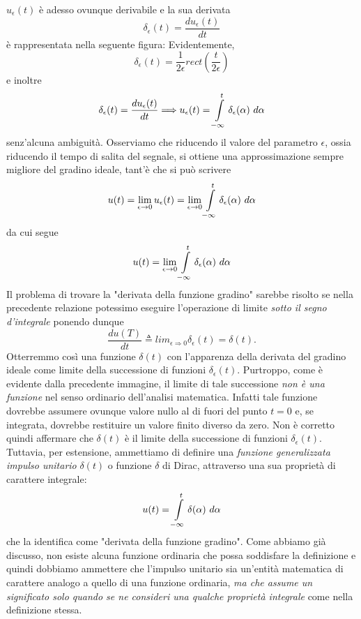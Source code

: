 \documentclass[12pt,oneside,openany]{memoir}
\numberwithin{equation}{subsection}
\begin{document}
$u_{\epsilon}(t)$ \`e adesso ovunque derivabile e la sua derivata
\[
    \delta_{\epsilon}(t) = \frac{d u_{\epsilon}(t)}{dt}
\]
\`e rappresentata nella seguente figura:
Evidentemente,
\[
    \delta_{\epsilon}(t) = \frac{1}{2 \epsilon} rect\left(\frac{t}{2 \epsilon}
    \right)
\]
e inoltre
\[
    \delta_{\epsilon}(t) = \frac{d u_{\epsilon}(t)}{dt} \Longrightarrow
    u_{\epsilon}(t) = \int\displaylimits_{-\infty}^{t} \delta_{\epsilon}(\alpha)
    \ d\alpha
\]
senz'alcuna ambiguit\`a.
\bigbreak
Osserviamo che riducendo il valore del parametro $\epsilon$, ossia riducendo il
tempo di salita del segnale, si ottiene una approssimazione sempre migliore del
gradino ideale, tant'\`e che si pu\`o scrivere
\[
    u(t) = \lim_{\epsilon \rightarrow 0} u_{\epsilon}(t) =
    \lim_{\epsilon \rightarrow 0}
    \int\displaylimits_{-\infty}^{t} \delta_{\epsilon}(\alpha) \ d\alpha
\]
da cui segue
\[
    u(t) = \lim_{\epsilon \rightarrow 0}
    \int\displaylimits_{-\infty}^{t} \delta_{\epsilon}(\alpha) \ d\alpha
\]
Il problema di trovare la "derivata della funzione gradino" sarebbe risolto se
nella precedente relazione potessimo eseguire l'operazione di limite
\textit{sotto il segno d'integrale} ponendo dunque
\[
    \frac{d u(T)}{dt} \triangleq lim_{\epsilon \Rightarrow 0}
    \delta_{\epsilon}(t) = \delta(t).
\]
Otterremmo cos\`i una funzione $\delta(t)$ con l'apparenza della derivata del
gradino ideale come limite della successione di funzioni $\delta_{\epsilon}(t)$.
Purtroppo, come \`e evidente dalla precedente immagine, il limite di tale
successione \textit{non \`e una funzione} nel senso ordinario dell'analisi
matematica. Infatti tale funzione dovrebbe assumere ovunque valore nullo al di
fuori del punto $t = 0$ e, se integrata, dovrebbe restituire un valore finito
diverso da zero. Non \`e corretto quindi affermare che $\delta(t)$ \`e il limite
della successione di funzioni $\delta_{\epsilon}(t)$. Tuttavia, per estensione,
ammettiamo di definire una \textit{funzione generalizzata impulso unitario}
$\delta(t)$ o funzione $\delta$ di Dirac, attraverso una sua propriet\`a di
carattere integrale:
\[
    u(t) = \int\displaylimits_{-\infty}^{t} \delta(\alpha) \ d\alpha
\]
che la identifica come "derivata della funzione gradino".
\bigbreak
Come abbiamo gi\`a discusso, non esiste alcuna funzione ordinaria che possa
soddisfare la definizione e quindi dobbiamo ammettere che l'impulso unitario sia
un'entit\`a matematica di carattere analogo a quello di una funzione ordinaria,
\textit{ma che assume un significato solo quando se ne consideri una qualche
propriet\`a integrale} come nella definizione stessa.
\end{document}
